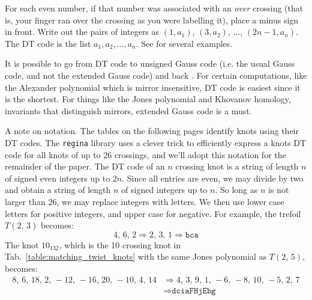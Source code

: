 \documentclass{article}
\theoremstyle{plain}
\begin{document}
        For each even number, if that number was associated
        with an \textit{over} crossing (that is, your finger ran over the
        crossing as you were labelling it), place a minus sign in front. Write
        out the pairs of integers as $(1,a_{1})$, $(3,a_{2})$, $\dots$,
        $(2n-1,a_{n})$. The DT code is the list $a_{1},a_{2},\dots,a_{n}$.
        See \cite{KatlasDTCode} for several examples.
        \par\hfill\par
        It is possible to go from DT code to unsigned
        Gauss code (i.e. the usual Gauss code, and not the extended Gauss code)
        and back \cite{KatlasDTCode}. For certain computations,
        like the Alexander polynomial which
        is mirror insensitive, DT code is easiest since it is the shortest.
        For things like the Jones polynomial and Khovanov homology, invariants
        that distinguish mirrors, extended Gauss code is a must.
        \par\hfill\par
        A note on notation. The tables on the following pages identify knots
        using their DT codes. The \texttt{regina} library \cite{regina} uses a
        clever trick to efficiently express a knots DT code
        for all knots of up to 26 crossings, and we'll
        adopt this notation for the remainder of the paper. The DT code of an
        $n$ crossing knot is a string of length $n$ of signed even integers up
        to $2n$. Since all entries are even, we may divide by two and obtain
        a string of length $n$ of signed integers up to $n$. So long as $n$ is
        not larger than 26, we may replace integers with letters. We then use
        lower case letters for positive integers, and upper case for negative.
        For example, the trefoil $T(2,\,3)$ becomes:
        \begin{equation}
            4,\,6,\,2
            \Rightarrow
            2,\,3,\,1
            \Rightarrow
            \texttt{bca}
        \end{equation}
        The knot $10_{132}$, which is the 10 crossing knot in
        Tab.~\ref{table:matching_twist_knots} with the same Jones polynomial
        as $T(2,\,5)$, becomes:
        \begin{align}
            8,\,6,\,18,\,2,\,-12,\,-16,\,20,\,-10,\,4,\,14
            &\Rightarrow
            4,\,3,\,9,\,1,\,-6,\,-8,\,10,\,-5,\,2,\,7\\
            &\Rightarrow
            \texttt{dciaFHjEbg}
        \end{align}
\end{document}
